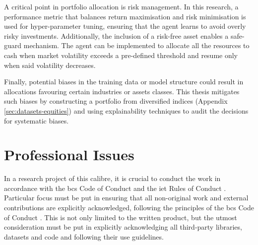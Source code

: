 A critical point in portfolio allocation is risk management. In this research, a performance metric that balances return maximisation and risk minimisation is used for hyper-parameter tuning, ensuring that the agent learns to avoid overly risky investments. Additionally, the inclusion of a risk-free asset enables a safe-guard mechanism. The agent can be implemented to allocate all the resources to cash when market volatility exceeds a pre-defined threshold and resume only when said volatility decreases.

Finally, potential biases in the training data or model structure could result in allocations favouring certain industries or assets classes. This thesis mitigates such biases by constructing a portfolio from diversified indices (Appendix \ref{sec:datasets-equities}) and using explainability techniques to audit the decisions for systematic biases.

\section{Professional Issues} \label{sec:professional-issues}

In a research project of this calibre, it is crucial to conduct the work in accordance with the \acrfull{bcs} Code of Conduct \cite{BCSCodeConduct} and the \acrfull{iet} Rules of Conduct \cite{IETRules}. Particular focus must be put in ensuring that all non-original work and external contributions are explicitly acknowledged, following the principles of the \acrshort{bcs} Code of Conduct \cite{BCSCodeConduct}. This is not only limited to the written product, but the utmost consideration must be put in explicitly acknowledging all third-party libraries, datasets and code and following their use guidelines.
